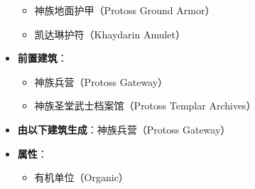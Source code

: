 \begin{tcolorbox}[colback=white, colframe=black!60!white, title=Protoss\_High\_Templar(), arc=0mm]
\begin{itemize}
\begin{itemize}
                \item 神族地面护甲（Protoss Ground Armor）
                \item 凯达琳护符（Khaydarin Amulet）
            \end{itemize}
        \item \textbf{前置建筑}：
            \begin{itemize}
                \item 神族兵营（Protoss Gateway）
                \item 神族圣堂武士档案馆（Protoss Templar Archives）
            \end{itemize}
        \item \textbf{由以下建筑生成}：神族兵营（Protoss Gateway）
        \item \textbf{属性}：
            \begin{itemize}
                \item 有机单位（Organic）
            \end{itemize}
    \end{itemize}
\end{tcolorbox}

